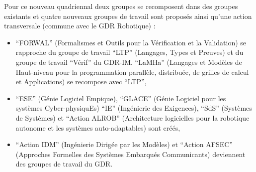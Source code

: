 \documentclass[11pt]{article}
\begin{document}
\bigskip

\noindent
Pour ce nouveau quadriennal deux groupes se recomposent dans des groupes
existants et quatre nouveaux groupes de travail sont proposés ainsi qu'une
action transversale (commune avec le GDR Robotique) :
\begin{itemize}
  \item ``FORWAL'' (Formalismes et Outils pour la Vérification et la
    Validation) se rapproche du groupe de travail ``LTP'' (Langages, Types et
    Preuves) et du groupe de travail ``Vérif'' du GDR-IM. ``LaMHa'' (Langages
    et Modèles de Haut-niveau pour la programmation parallèle, distribuée, de
    grilles de calcul et Applications) se recompose avec ``LTP'',

  \item ``ESE'' (Génie Logiciel Empique), ``GLACE'' (Génie Logiciel pour les
  systèmes Cyber-physiquEs) ``IE'' (Ingénierie des Exigences), ``SdS''
  (Systèmes de Systèmes) et ``Action ALROB'' (Architecture logicielles pour la
  robotique autonome et les systèmes auto-adaptables) sont créés,

\item ``Action IDM'' (Ingénierie Dirigée par les Modèles) et ``Action AFSEC''
  (Approches Formelles des Systèmes Embarqués Communicants) deviennent des
  groupes de travail du GDR.
\end{itemize}
\end{document}
